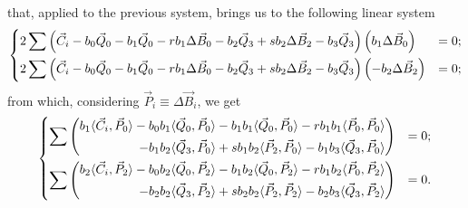 \documentclass{scrartcl}
\newcommand\V[1]{\vec{#1}}
\newcommand\SP[2]{\langle #1, #2 \rangle}
\begin{document}
that, applied to the previous system, brings us to the following linear system
\begin{equation*}
\begin{dcases}
    2 \sum \left(
	\V{C}_i - b_0 \V{Q}_0 - b_1 \V{Q}_0 - r b_1 \Delta \V{B}_0 -
	b_2 \V{Q}_3 + s b_2 \Delta \V{B}_2 - b_3 \V{Q}_3
    \right) \left( b_1 \Delta \V{B}_0 \right) &= 0; \\
    2 \sum \left(
	\V{C}_i - b_0 \V{Q}_0 - b_1 \V{Q}_0 - r b_1 \Delta \V{B}_0 -
	b_2 \V{Q}_3 + s b_2 \Delta \V{B}_2 - b_3 \V{Q}_3
    \right) \left( -b_2 \Delta \V{B}_2 \right) &= 0; \\
\end{dcases}
\end{equation*}
from which, considering $\V{P}_i \equiv \Delta \V{B}_i$, we get
\begin{equation*}
\begin{dcases}
    \sum \left(
    \begin{split}
	b_1       \SP{\V{C}_i}{\V{P}_0} -
	b_0 b_1   \SP{\V{Q}_0}{\V{P}_0} -
	b_1 b_1   \SP{\V{Q}_0}{\V{P}_0} -
	r b_1 b_1 \SP{\V{P}_0}{\V{P}_0} \\ -
	b_1 b_2   \SP{\V{Q}_3}{\V{P}_0} +
	s b_1 b_2 \SP{\V{P}_2}{\V{P}_0} -
	b_1 b_3   \SP{\V{Q}_3}{\V{P}_0}
    \end{split}
    \right) &= 0; \\
    \sum \left(
    \begin{split}
	b_2       \SP{\V{C}_i}{\V{P}_2} -
	b_0 b_2   \SP{\V{Q}_0}{\V{P}_2} -
	b_1 b_2   \SP{\V{Q}_0}{\V{P}_2} -
	r b_1 b_2 \SP{\V{P}_0}{\V{P}_2} \\ -
	b_2 b_2   \SP{\V{Q}_3}{\V{P}_2} +
	s b_2 b_2 \SP{\V{P}_2}{\V{P}_2} -
	b_2 b_3   \SP{\V{Q}_3}{\V{P}_2}
    \end{split}
    \right) &= 0. \\
\end{dcases}
\end{equation*}
\end{document}
